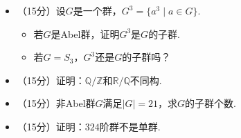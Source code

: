 \begin{itemize}
\item[（三）] （15分）设$G$是一个群，$G^3=\{a^3\mid a\in G\}$.
\begin{itemize}
    \item[1.] 若$G$是Abel群，证明$G^3$是$G$的子群.
    \item[2.] 若$G=S_3$，$G^3$还是$G$的子群吗？
\end{itemize}

\item[（四）] （15分）证明：$\mathbb{Q}/\mathbb{Z}$和$\mathbb{R}/\mathbb{Q}$不同构.

\item[（五）] （15分）非Abel群$G$满足$|G|=21$，求$G$的子群个数.

\item[（六）] （15分）证明：$324$阶群不是单群.
\end{itemize}

